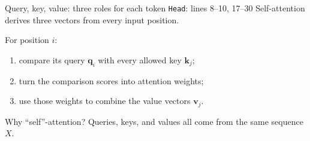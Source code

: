 \begin{frame}{Query, key, value: three roles for each token
  \hfill{\tiny \texttt{Head}: lines 8--10, 17--30}}
  \small
  Self-attention derives three vectors from every input position.

  \begin{center}
  \end{center}

  \vspace{0.6em}
  For position $i$:
  \begin{enumerate}
    \item compare its query $\mathbf q_i$ with every allowed key $\mathbf k_j$;
    \item turn the comparison scores into attention weights;
    \item use those weights to combine the value vectors $\mathbf v_j$.
  \end{enumerate}

  \begin{alertblock}{Why ``self''-attention?}
    Queries, keys, and values all come from the same sequence $X$.
  \end{alertblock}
\end{frame}

